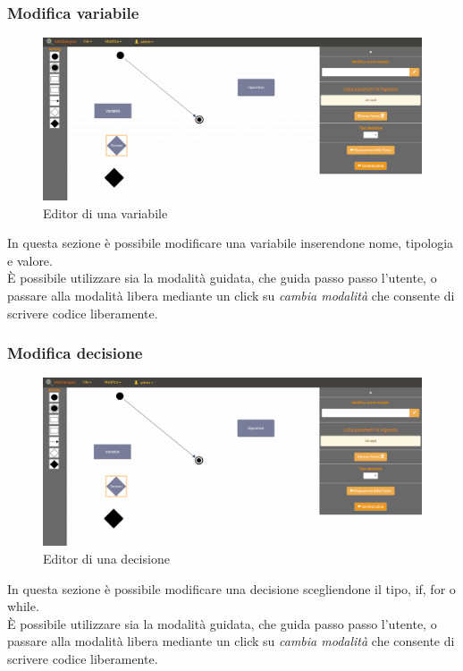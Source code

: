	\subsubsection{Modifica variabile}
		\begin{figure}[h!]
		 \centering
			 \includegraphics[scale=0.22]{res/img/activity3.png}
		 \caption{Editor di una variabile}
	 \end{figure}
		In questa sezione è possibile modificare una variabile inserendone nome, tipologia e valore.\\
		È possibile utilizzare sia la modalità guidata, che guida passo passo l'utente, o passare alla modalità libera mediante un click su \emph{cambia modalità} che consente di scrivere
		codice liberamente.\\
	\subsubsection{Modifica decisione}
		\begin{figure}[h!]
		 \centering
			 \includegraphics[scale=0.22]{res/img/activity4.png}
		 \caption{Editor di una decisione}
	 \end{figure}
	 In questa sezione è possibile modificare una decisione scegliendone il tipo, if, for o while.\\
 	È possibile utilizzare sia la modalità guidata, che guida passo passo l'utente, o passare alla modalità libera mediante un click su \emph{cambia modalità} che consente di scrivere
 	codice liberamente.\\

